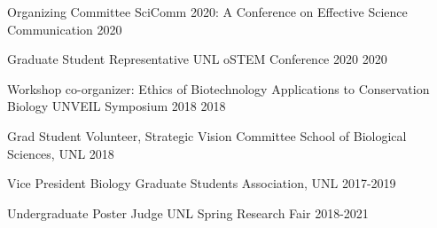\begin{cvservices}
 \cvservice
    {Organizing Committee}
    {SciComm 2020: A Conference on Effective Science Communication}
    {2020}

 \cvservice
    {Graduate Student Representative}
    {UNL oSTEM Conference 2020}
    {2020}
    
  \cvservice
    {Workshop co-organizer: Ethics of Biotechnology Applications to Conservation Biology}
    {UNVEIL Symposium 2018}
    {2018}

  \cvservice
    {Grad Student Volunteer, Strategic Vision Committee}
    {School of Biological Sciences, UNL}
    {2018}
    
  \cvservice
    {Vice President}
    {Biology Graduate Students Association, UNL}
    {2017-2019}
    
  \cvservice
    {Undergraduate Poster Judge}
    {UNL Spring Research Fair}
    {2018-2021}
\end{cvservices}
